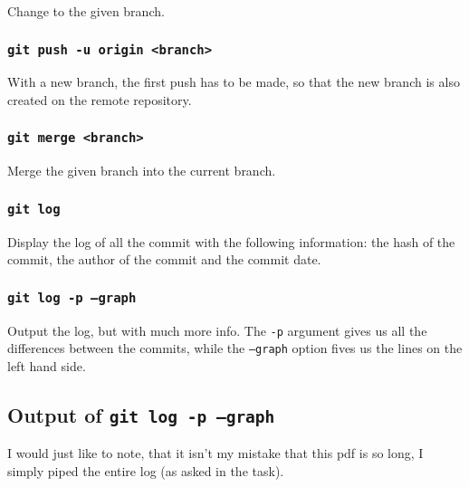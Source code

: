 \documentclass[12pt,a4paper]{article}
\begin{document}
				Change to the given branch.
			
			\subsubsection{\texttt{git push -u origin <branch>}}
			
				With a new branch, the first push has to be made, so that the new branch is also created on the remote repository.
			
			\subsubsection{\texttt{git merge <branch>}}
			
				Merge the given branch into the current branch.
				
			\subsubsection{\texttt{git log}}
			
				Display the log of all the commit with the following information: the hash of the commit, the author of the commit and the commit date.
				
			\subsubsection{\texttt{git log -p --graph}}
			
				Output the log, but with much more info. The \texttt{-p} argument gives us all the differences between the commits, while the \texttt{--graph} option fives us the lines on the left hand side.
			
				
			
		\subsection{Output of \texttt{git log -p --graph}}
		
			I would just like to note, that it isn't my mistake that this pdf is so long, I simply piped the entire log (as asked in the task).
			
			\begin{scriptsize}
				
			\end{scriptsize}
		
		
	
			
\end{document}
